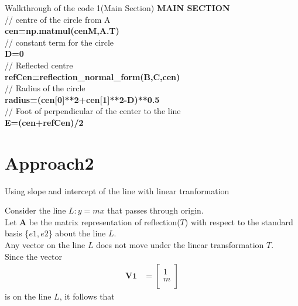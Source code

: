 \documentclass{beamer}
\begin{document}
\begin{frame}{Walkthrough of the code 1(Main Section)}
\textbf{MAIN SECTION}\\
// centre of the circle from A\\
\textbf{cen=np.matmul(cenM,A.T)} \\

// constant term for the circle \\
\textbf{D=0} \\

// Reflected centre \\
\textbf{refCen=reflection\_normal\_form(B,C,cen)} \\

// Radius of the circle \\
\textbf{radius=(cen[0]**2+cen[1]**2-D)**0.5} \\

// Foot of perpendicular of the center to the line \\
\textbf{E=(cen+refCen)/2} \\
\end{frame}

\section{ Approach2 }
\begin{frame}{Using slope and intercept of the line with linear tranformation}
\begin{solution}
Consider the line $L:y = mx$ that passes through origin.\\
Let $\boldsymbol{A}$ be the matrix representation of reflection($T$) with respect to the standard basis \{$e1, e2$\} about the line $L$.\\
Any vector on the line $L$ does not move under the linear transformation $T$.\\
Since the vector 
\begin{align}
    \boldsymbol{V1} &= \begin{bmatrix}
          1 \\
          m \\
         \end{bmatrix}
\end{align} 
is on the line $L$, it follows that
\end{solution}
\end{frame}
\end{document}
